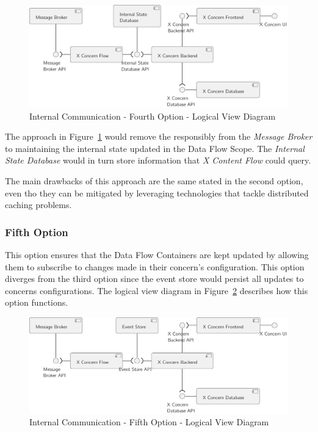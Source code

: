 \begin{figure}[H]
   \centering
   \includegraphics[page=1,width=0.8\columnwidth]{assets/diagrams/design/alternatives/internal/alternative4.pdf}
   \caption[Internal Communication - Fourth Option - Logical View Diagram]{Internal Communication - Fourth Option - Logical View Diagram}
   \label{fig:design:alternatives:internal:fourth:diagram}
\end{figure}

The approach in Figure~\ref{fig:design:alternatives:internal:fourth:diagram} would remove the responsibly from the \textit{Message Broker} to maintaining the internal state updated in the Data Flow Scope.
The \textit{Internal State Database} would in turn store information that \textit{X Content Flow} could query.

The main drawbacks of this approach are the same stated in the second option, even tho they can be mitigated by leveraging technologies that tackle distributed caching problems.

\subsubsection{Fifth Option}
\label{subsubsec:design:alternatives:internal:fifth}

This option ensures that the Data Flow Containers are kept updated by allowing them to subscribe to changes made in their concern's configuration. This option diverges from the third option since the event store would persist all updates to concerns configurations. The logical view diagram in Figure~\ref{fig:design:alternatives:internal:fifth:diagram} describes how this option functions.

\begin{figure}[H]
   \centering
   \includegraphics[page=1,width=0.8\columnwidth]{assets/diagrams/design/alternatives/internal/alternative5.pdf}
   \caption[Internal Communication - Fifth Option - Logical View Diagram]{Internal Communication - Fifth Option - Logical View Diagram}
   \label{fig:design:alternatives:internal:fifth:diagram}
\end{figure}

